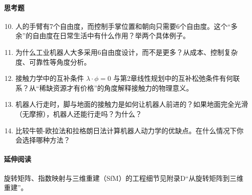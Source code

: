 \paragraph{思考题}
\begin{enumerate}
    \setcounter{enumi}{9}
    \item 人的手臂有7个自由度，而控制手掌位置和朝向只需要6个自由度。这个“多余”的自由度在日常生活中有什么作用？举两个具体例子。
    
    \item 为什么工业机器人大多采用6自由度设计，而不是更多？从成本、控制复杂度、可靠性等角度分析。
    
    \item 接触力学中的互补条件 $\lambda \cdot \phi = 0$ 与第2章线性规划中的互补松弛条件有何联系？从“稀缺资源才有价格”的角度解释接触力的物理意义。
    
    \item 机器人行走时，脚与地面的接触力是如何让机器人前进的？如果地面完全光滑（无摩擦），机器人还能行走吗？为什么？
    
    \item 比较牛顿-欧拉法和拉格朗日法计算机器人动力学的优缺点。在什么情况下你会选择哪种方法？
\end{enumerate}



\paragraph{延伸阅读}
旋转矩阵、指数映射与三维重建（SfM）的工程细节见附录D“从旋转矩阵到三维重建”。
